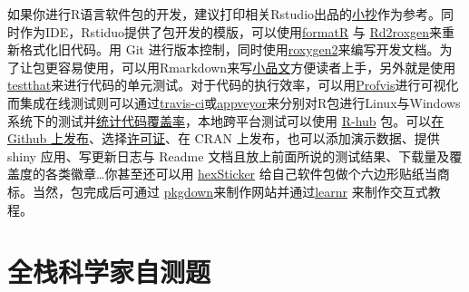 \documentclass[]{tufte-book}
\begin{document}
如果你进行R语言软件包的开发，建议打印相关Rstudio出品的\href{https://www.rstudio.com/resources/cheatsheets/}{小抄}作为参考。同时作为IDE，Rstiduo提供了包开发的模版，可以使用\href{https://yihui.name/formatr/}{formatR} 与 \href{https://cran.r-project.org/web/packages/Rd2roxygen/index.html}{Rd2roxgen}来重新格式化旧代码。用 Git 进行版本控制，同时使用\href{https://cran.r-project.org/web/packages/roxygen2/index.html}{roxygen2}来编写开发文档。为了让包更容易使用，可以用Rmarkdown来写\href{http://r-pkgs.had.co.nz/vignettes.html}{小品文}方便读者上手，另外就是使用\href{https://github.com/r-lib/testthat}{testthat}来进行代码的单元测试。对于代码的执行效率，可以用\href{https://rstudio.github.io/profvis/}{Profvis}进行可视化而集成在线测试则可以通过\href{https://travis-ci.org/}{travis-ci}或\href{https://www.appveyor.com/}{appveyor}来分别对R包进行Linux与Windows系统下的测试并\href{https://en.wikipedia.org/wiki/Code_coverage}{统计代码覆盖率}，本地跨平台测试可以使用 \href{https://cran.r-project.org/web/packages/rhub/index.html}{R-hub} 包。可以\href{https://github.com/}{在 Github 上发布}、选择\href{https://zh.wikipedia.org/wiki/\%E8\%87\%AA\%E7\%94\%B1\%E5\%8F\%8A\%E9\%96\%8B\%E6\%94\%BE\%E5\%8E\%9F\%E5\%A7\%8B\%E7\%A2\%BC\%E8\%BB\%9F\%E9\%AB\%94\%E8\%A8\%B1\%E5\%8F\%AF\%E8\%AD\%89\%E6\%AF\%94\%E8\%BC\%83}{许可证}、在 CRAN 上发布，也可以添加演示数据、提供 shiny 应用、写更新日志与 Readme 文档且放上前面所说的测试结果、下载量及覆盖度的各类徽章\ldots 你甚至还可以用 \href{https://github.com/GuangchuangYu/hexSticker}{hexSticker} 给自己软件包做个六边形贴纸当商标。当然，包完成后可通过 \href{https://github.com/r-lib/pkgdown}{pkgdown}来制作网站并通过\href{https://rstudio.github.io/learnr/}{learnr} 来制作交互式教程。

\hypertarget{ux5168ux6808ux79d1ux5b66ux5bb6ux81eaux6d4bux9898}{%
\section*{全栈科学家自测题}\label{ux5168ux6808ux79d1ux5b66ux5bb6ux81eaux6d4bux9898}}
\end{document}
